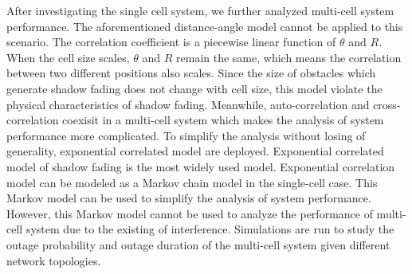 \par After investigating the single cell system, we further analyzed multi-cell system performance. The aforementioned distance-angle model cannot be applied to this scenario. The correlation coefficient is a piecewise linear function of $\theta$ and $R$. When the cell size scales, $\theta$ and $R$ remain the same, which means the correlation between two different positions also scales. Since the size of obstacles which generate shadow fading does not change with cell size, this model violate the physical characteristics of shadow fading. Meanwhile, auto-correlation and cross-correlation coexisit in a multi-cell system which makes the analysis of system performance more complicated. To simplify the analysis without losing of generality, exponential correlated model are deployed. Exponential correlated model of shadow fading is the most widely used model. Exponential correlation model can be modeled as a Markov chain model in the single-cell case. This Markov model can be used to simplify the analysis of system performance. However, this Markov model cannot be used to analyze the performance of multi-cell system due to the existing of interference. Simulations are run to study the outage probability and outage duration of the multi-cell system given different network topologies. 


